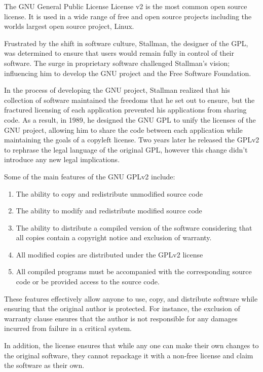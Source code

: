 \documentclass[12pt,letterpaper]{article}
\begin{document}
The GNU General Public License License v2 is the most common open source license. It is used in a wide range of free and open source projects including the worlds largest open source project, Linux.

Frustrated by the shift in software culture, Stallman, the designer of the GPL, was determined to ensure that users would remain fully in control of their software. The surge in proprietary software challenged Stallman's vision; influencing him to develop the GNU project and the Free Software Foundation.

In the process of developing the GNU project, Stallman realized that his collection of software maintained the freedoms that he set out to ensure, but the fractured licensing of each application prevented his applications from sharing code. As a result, in 1989, he designed the GNU GPL to unify the licenses of the GNU project, allowing him to share the code between each application while maintaining the goals of a copyleft license. Two years later he released the GPLv2 to rephrase the legal language of the original GPL, however this change didn't introduce any new legal implications.

Some of the main features of the GNU GPLv2 include:
\begin{enumerate}
\item The ability to copy and redistribute unmodified source code
\item The ability to modify and redistribute modified source code
\item The ability to distribute a compiled version of the software considering that all copies contain a copyright notice and exclusion of warranty.
\item All modified copies are distributed under the GPLv2 license
\item All compiled programs must be accompanied with the corresponding source code or be provided access to the source code.
\end{enumerate}

\cite{gpl2}

These features effectively allow anyone to use, copy, and distribute software while ensuring that the original author is protected. For instance, the exclusion of warranty clause ensures that the author is not responsible for any damages incurred from failure in a critical system.

In addition, the license ensures that while any one can make their own changes to the original software, they cannot repackage it with a non-free license and claim the software as their own.
\end{document}

